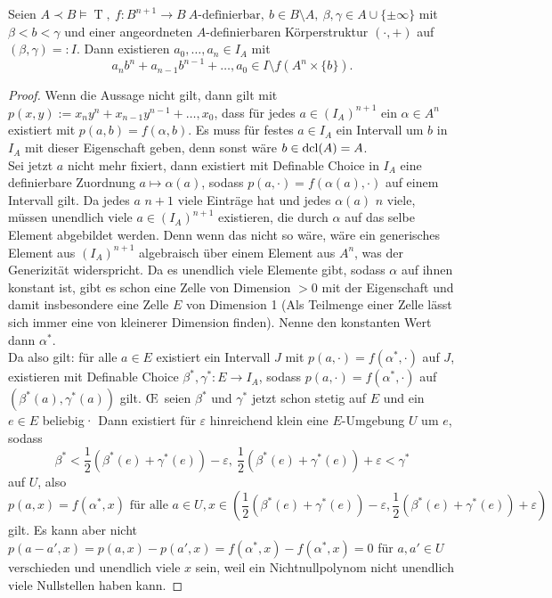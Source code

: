 \begin{lemma}\label{Hilfsaussage Kleinheit}
	Seien $A\prec B\models\operatorname{T},\ f:B^{n+1}\rightarrow B\ A\text{-definierbar},\ b\in B\setminus A,\ \beta,\gamma\in A\cup\{\pm\infty\}$ mit $\beta<b<\gamma$ und einer angeordneten $A$-definierbaren Körperstruktur $(\cdot,+)$ auf $(\beta,\gamma)=:I$. Dann existieren $a_0,\dots,a_n\in I_A$ mit $$a_nb^n+a_{n-1}b^{n-1}+\dots,a_0\in I\setminus f(A^n\times\{b\}).$$
\end{lemma}
\begin{proof}
	Wenn die Aussage nicht gilt, dann gilt mit $p(x,y):=x_ny^n+x_{n-1}y^{n-1}+\dots,x_0$, dass für jedes $a\in (I_A)^{n+1}$ ein $\alpha\in A^n$ existiert mit $p(a,b)=f(\alpha,b)$. Es muss für festes $a\in I_A$ ein Intervall um $b$ in $I_A$ mit dieser Eigenschaft geben, denn sonst wäre $b\in\operatorname{dcl}(A)=A$.\\
	Sei jetzt $a$ nicht mehr fixiert, dann existiert mit Definable Choice in $I_A$ eine definierbare Zuordnung $a\mapsto\alpha(a)$, sodass $p(a,\cdot)=f(\alpha(a),\cdot)$ auf einem Intervall gilt. Da jedes $a$ $n+1$ viele Einträge hat und jedes $\alpha(a)$ $n$ viele, müssen unendlich viele $a\in (I_A)^{n+1}$ existieren, die durch $\alpha$ auf das selbe Element abgebildet werden. Denn wenn das nicht so wäre, wäre ein generisches Element aus $(I_A)^{n+1}$ algebraisch über einem Element aus $A^n$, was der Generizität widerspricht. Da es unendlich viele Elemente gibt, sodass $\alpha$ auf ihnen konstant ist, gibt es schon eine Zelle von Dimension $>0$ mit der Eigenschaft und damit insbesondere eine Zelle $E$ von Dimension 1 (Als Teilmenge einer Zelle lässt sich immer eine von kleinerer Dimension finden). Nenne den konstanten Wert dann $\alpha^*$.\\
	Da also gilt: für alle $a\in E$ existiert ein Intervall $J$ mit $p(a,\cdot)=f(\alpha^*,\cdot)$ auf $J$, existieren mit Definable Choice $\beta^*,\gamma^*:E\rightarrow I_A$, sodass $p(a,\cdot)=f(\alpha^*,\cdot)$ auf $(\beta^*(a),\gamma^*(a))$ gilt. \OE\ seien $\beta^*$ und $\gamma^*$ jetzt schon stetig auf $E$ und ein $e\in E$ beliebig· Dann existiert für $\varepsilon$ hinreichend klein eine $E$-Umgebung $U$ um $e$, sodass $$\beta^*<\frac{1}{2}(\beta^*(e)+\gamma^*(e))-\varepsilon,\ \frac{1}{2}(\beta^*(e)+\gamma^*(e))+\varepsilon<\gamma^*$$ auf $U$, also $$p(a,x)=f(\alpha^*,x)\text{ für alle }a\in U,x\in(\frac{1}{2}(\beta^*(e)+\gamma^*(e))-\varepsilon,\frac{1}{2}(\beta^*(e)+\gamma^*(e))+\varepsilon)$$ gilt. Es kann aber nicht $p(a-a',x)=p(a,x)-p(a',x)=f(\alpha^*,x)-f(\alpha^*,x)=0$ für $a,a'\in U$ verschieden und unendlich viele $x$ sein, weil ein Nichtnullpolynom nicht unendlich viele Nullstellen haben kann.
\end{proof}

